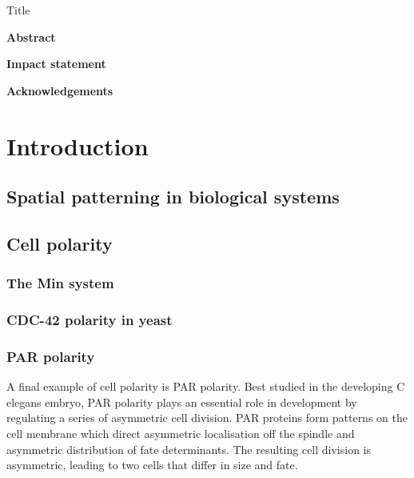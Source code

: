 \documentclass[12pt]{"article"}
\begin{document}
\begin{titlepage}
\centering
{\huge Title\\}
\end{titlepage}


\pagebreak

\begin{Large}
\textbf{Abstract}\\
\end{Large}


\pagebreak

\begin{Large}
\textbf{Impact statement}\\
\end{Large}


\pagebreak

\begin{Large}
\textbf{Acknowledgements}\\
\end{Large}


\tableofcontents
\listoffigures


\clearpage
\section{Introduction}

\subsection{Spatial patterning in biological systems}

\clearpage
\subsection{Cell polarity}
\subsubsection{The Min system}
\subsubsection{CDC-42 polarity in yeast}
\subsubsection{PAR polarity}

A final example of cell polarity is PAR polarity. Best studied in the developing C elegans embryo, PAR polarity plays an essential role in development by regulating a series of asymmetric cell division. PAR proteins form patterns on the cell membrane which direct asymmetric localisation off the spindle and asymmetric distribution of fate determinants. The resulting cell division is asymmetric, leading to two cells that differ in size and fate.\\
\end{document}
